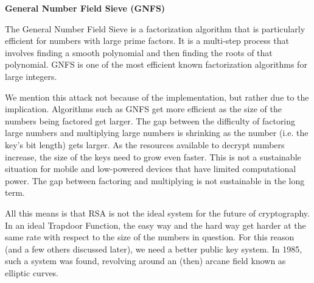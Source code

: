 \documentclass{article}
\begin{document}
    \begin{center}
    \textbf{General Number Field Sieve (GNFS)}
    \end{center}
    
    The General Number Field Sieve is a factorization algorithm that is particularly efficient for numbers with large prime factors. It is a multi-step process that involves finding a smooth polynomial and then finding the roots of that polynomial. GNFS is one of the most efficient known factorization algorithms for large integers.
    
    \vspace{3mm}
    We mention this attack not because of the implementation, but rather due to the implication. Algorithms such as GNFS get more efficient as the size of the numbers being factored get larger. The gap between the difficulty of factoring large numbers and multiplying large numbers is shrinking as the number (i.e. the key's bit length) gets larger. As the resources available to decrypt numbers increase, the size of the keys need to grow even faster. This is not a sustainable situation for mobile and low-powered devices that have limited computational power. The gap between factoring and multiplying is not sustainable in the long term.
    
    \vspace{2mm}
    All this means is that RSA is not the ideal system for the future of cryptography. In an ideal Trapdoor Function, the easy way and the hard way get harder at the same rate with respect to the size of the numbers in question. For this reason (and a few others discussed later), we need a better public key system. In 1985, such a system was found, revolving around an (then) arcane field known as elliptic curves.
\end{document}
